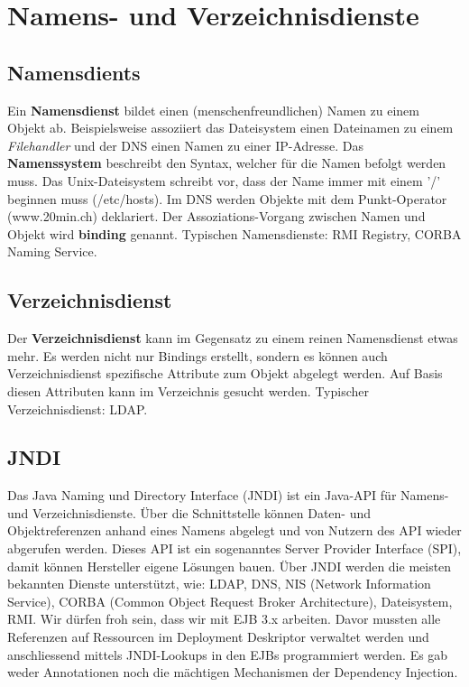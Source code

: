 \chapter{Namens- und Verzeichnisdienste}

\section{Namensdients}
Ein \textbf{Namensdienst} bildet einen (menschenfreundlichen) Namen zu einem Objekt ab. Beispielsweise assoziiert das Dateisystem einen Dateinamen zu einem \emph{Filehandler} und der DNS einen Namen zu einer IP-Adresse. Das \textbf{Namenssystem} beschreibt den Syntax, welcher für die Namen befolgt werden muss. Das Unix-Dateisystem schreibt vor, dass der Name immer mit einem '/' beginnen muss (/etc/hosts). Im DNS werden Objekte mit dem Punkt-Operator (www.20min.ch) deklariert. Der Assoziations-Vorgang zwischen Namen und Objekt wird \textbf{binding} genannt. Typischen Namensdienste: RMI Registry, CORBA Naming Service.

\section{Verzeichnisdienst}
Der \textbf{Verzeichnisdienst} kann im Gegensatz zu einem reinen Namensdienst etwas mehr. Es werden nicht nur Bindings erstellt, sondern es können auch Verzeichnisdienst spezifische Attribute zum Objekt abgelegt werden. Auf Basis diesen Attributen kann im Verzeichnis gesucht werden. Typischer Verzeichnisdienst: LDAP.

\section{JNDI}
Das Java Naming und Directory Interface (JNDI) ist ein Java-API für Namens- und Verzeichnisdienste. Über die Schnittstelle können Daten- und Objektreferenzen anhand eines Namens abgelegt und von Nutzern des API wieder abgerufen werden. Dieses API ist ein sogenanntes Server Provider Interface (SPI), damit können Hersteller eigene Lösungen bauen. Über JNDI werden die meisten bekannten Dienste unterstützt, wie: LDAP, DNS, NIS (Network Information Service), CORBA (Common Object Request Broker Architecture), Dateisystem, RMI. Wir dürfen froh sein, dass wir mit EJB 3.x arbeiten. Davor mussten alle Referenzen auf Ressourcen im Deployment Deskriptor verwaltet werden und anschliessend mittels JNDI-Lookups in den EJBs programmiert werden. Es gab weder Annotationen noch die mächtigen Mechanismen der Dependency Injection.

